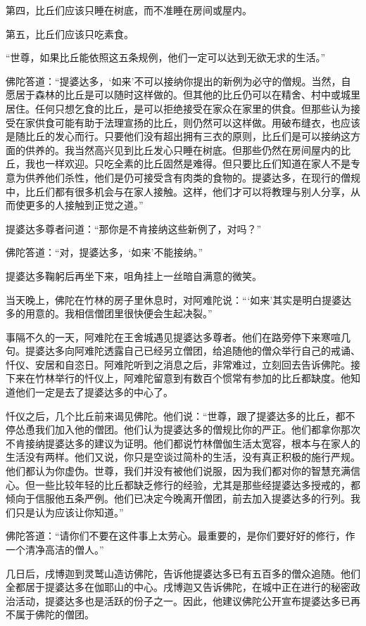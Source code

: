 \documentclass[12pt,twoside,openany]{book}
\begin{document}
第四，比丘们应该只睡在树底，而不准睡在房间或屋内。

第五，比丘们应该只吃素食。

“世尊，如果比丘能依照这五条规例，他们一定可以达到无欲无求的生活。”

佛陀答道：“提婆达多，‘如来’不可以接纳你提出的新例为必守的僧规。当然，自愿居于森林的比丘是可以随时这样做的。但其他的比丘仍可以在精舍、村中或城里居住。任何只想乞食的比丘，是可以拒绝接受在家众在家里的供食。但那些认为接受在家供食可能有助于法理宣扬的比丘，则仍然可以这样做。用破布缝衣，也应该是随比丘的发心而行。只要他们没有超出拥有三衣的原则，比丘们是可以接纳这方面的供养的。我当然高兴见到比丘发心只睡在树底。但那些仍然在房间屋内的比丘，我也一样欢迎。只吃全素的比丘固然是难得。但只要比丘们知道在家人不是专意为供养他们杀性，他们是仍可接受含有肉类的食物的。提婆达多，在现行的僧规中，比丘们都有很多机会与在家人接触。这样，他们才可以将教理与别人分享，从而使更多的人接触到正觉之道。”

提婆达多尊者问道：“那你是不肯接纳这些新例了，对吗？”

佛陀答道：“对，提婆达多，‘如来’不能接纳。”

提婆达多鞠躬后再坐下来，咀角挂上一丝暗自满意的微笑。

当天晚上，佛陀在竹林的房子里休息时，对阿难陀说：“‘如来’其实是明白提婆达多的用意的。我相信僧团里很快便会生起决裂。”

事隔不久的一天，阿难陀在王舍城遇见提婆达多尊者。他们在路旁停下来寒喧几句。提婆达多向阿难陀透露自己已经另立僧团，给追随他的僧众举行自己的戒诵、忏仪、安居和自恣日。阿难陀听到之消息之后，非常难过，立刻回去告诉佛陀。接下来在竹林举行的忏仪上，阿难陀留意到有数百个惯常有参加的比丘都缺度。他知道他们一定是去了提婆达多的中心了。

忏仪之后，几个比丘前来谒见佛陀。他们说：“世尊，跟了提婆达多的比丘，都不停怂恿我们加入他的僧团。他们认为提婆达多的僧规比你的严正。他们都拿你那次不肯接纳提婆达多的建议为证明。他们都说竹林僧伽生活太宽容，根本与在家人的生活没有两样。他们又说，你只是空谈过简朴的生活，没有真正积极的施行严规。他们都认为你虚伪。世尊，我们并没有被他们说服，因为我们都对你的智慧充满信心。但一些比较年轻的比丘都缺乏修行的经验，尤其是那些经提婆达多授戒的，都倾向于信服他五条严例。他们已决定今晚离开僧团，前去加入提婆达多的行列。我们只是认为应该让你知道。”

佛陀答道：“请你们不要在这件事上太劳心。最重要的，是你们要好好的修行，作一个清净高洁的僧人。”

几日后，戌博迦到灵鹫山造访佛陀，告诉他提婆达多已有五百多的僧众追随。他们全都居于提婆达多在伽耶山的中心。戌博迦又告诉佛陀，在城中正在进行的秘密政治活动，提婆达多也是活跃的份子之一。因此，他建议佛陀公开宣布提婆达多已再不属于佛陀的僧团。
\end{document}
